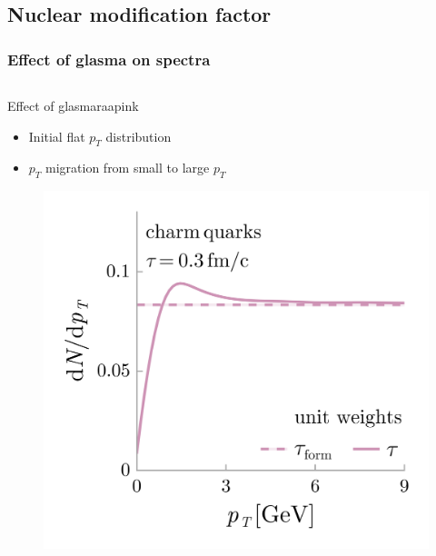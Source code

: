 \documentclass[aspectratio=169,11pt,usenames,dvipsnames]{beamer}
\begin{document}
\subsection{Nuclear modification factor}


\begin{frame}
    \frametitle{Effect of glasma on spectra}
    \vspace{-10pt}
    \begin{columns}[onlytextwidth,t]
        \begin{center}
            \begin{custombox}{{\normalsize Effect of glasma}}{raapink}
                \small
                \begin{varwidth}{0.85\textwidth}
                \begin{itemize}
                    \itemsep0em 
                    \footnotesize
                    \item Initial flat $p_T$ distribution
                    \item $p_T$ migration from small to large $p_T$
                \end{itemize}
                \end{varwidth}
            \end{custombox}

            \vspace{-15pt}
            \begin{figure}
                \centering
                \includegraphics[height=0.7\textheight]{images/final_sketch_raa_gl_fonll_v4_gl.png}
            \end{figure}
        \end{center}
        


\end{columns}
\end{frame}
\end{document}
